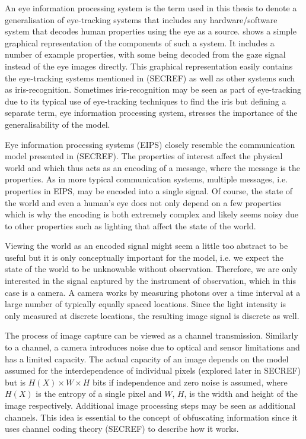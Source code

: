 An eye information processing system is the term used in this thesis to denote a generalisation of eye-tracking systems that includes any hardware/software system that decodes human properties using the eye as a source.  shows a simple graphical representation of the components of such a system. It includes a number of example properties, with some being decoded from the gaze signal instead of the eye images directly. This graphical representation easily contains the eye-tracking systems mentioned in (SECREF) as well as other systems such as iris-recognition. Sometimes iris-recognition may be seen as part of eye-tracking due to its typical use of eye-tracking techniques to find the iris but defining a separate term, eye information processing system, stresses the importance of the generalisability of the model.

Eye information processing systems (EIPS) closely resemble the communication model presented in (SECREF). The properties of interest affect the physical world and which thus acts as an encoding of a message, where the message is the properties. As in more typical communication systems, multiple messages, i.e. properties in EIPS, may be encoded into a single signal. Of course, the state of the world and even a human's eye does not only depend on a few properties which is why the encoding is both extremely complex and likely seems noisy due to other properties such as lighting that affect the state of the world. 

Viewing the world as an encoded signal might seem a little too abstract to be useful but it is only conceptually important for the model, i.e. we expect the state of the world to be unknowable without observation. Therefore, we are only interested in the signal captured by the instrument of observation, which in this case is a camera. A camera works by measuring photons over a time interval at a large number of typically equally spaced locations. Since the light intensity is only measured at discrete locations, the resulting image signal is discrete as well. 

The process of image capture can be viewed as a channel transmission. Similarly to a channel, a camera introduces noise due to optical and sensor limitations and has a limited capacity. The actual capacity of an image depends on the model assumed for the interdependence of individual pixels (explored later in SECREF) but is $H(X)\times W\times H$ bits if independence and zero noise is assumed, where $H(X)$ is the entropy of a single pixel and $W$, $H$, is the width and height of the image respectively. Additional image processing steps may be seen as additional channels. This idea is essential to the concept of obfuscating information since it uses channel coding theory (SECREF) to describe how it works. 

